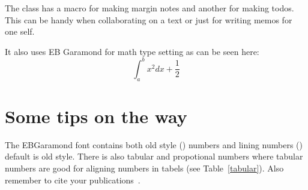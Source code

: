 \documentclass[pharmbio, watermark]{pbpreprint}
\begin{document}
The class has a macro for making margin notes and
another for making todos. This can be handy when
collaborating on a text or just for writing memos for one self.

It also uses EB Garamond for math type setting as can be seen here:
\begin{equation}
    \int_{a}^{b} x^2 dx + \frac{1}{2}
\end{equation}


\section{Some tips on the way}
The EBGaramond font contains both old style () numbers and lining numbers () default is old style. There is also tabular and propotional numbers where
tabular numbers are good for aligning numbers in tabels (see
Table~\ref{tabular}). Also remember to cite your
publications~\cite{spjuth2007bioclipse}.~\smiley{}


\begin{table}[h]
    \caption{Comparison of tabular nums and proportional numbers}
    \hfill
    \hfill
    \hfill
\end{table}
\end{document}
